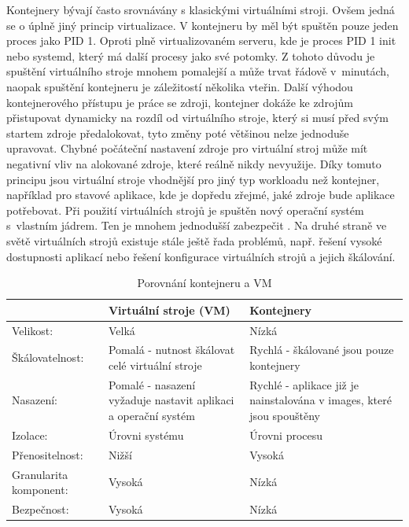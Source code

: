 Kontejnery bývají často srovnávány s klasickými virtuálními stroji. Ovšem jedná se o úplně jiný princip virtualizace. V kontejneru by měl být spuštěn pouze jeden proces jako PID 1. Oproti plně virtualizovaném serveru, kde je proces PID 1 init nebo systemd, který má další procesy jako své potomky. Z tohoto důvodu je spuštění virtuálního stroje mnohem pomalejší a může trvat řádově v minutách, naopak spuštění kontejneru je záležitostí několika vteřin. Další výhodou kontejnerového přístupu je práce se zdroji, kontejner dokáže ke zdrojům přistupovat dynamicky na rozdíl od virtuálního stroje, který si musí před svým startem zdroje předalokovat, tyto změny poté většinou nelze jednoduše upravovat. Chybné počáteční nastavení zdroje pro virtuální stroj může mít negativní vliv na alokované zdroje, které reálně nikdy nevyužije. Díky tomuto principu jsou virtuální stroje vhodnější pro jiný typ workloadu než kontejner, například pro stavové aplikace, kde je dopředu zřejmé, jaké zdroje bude aplikace potřebovat. Při použití virtuálních strojů je spuštěn nový operační systém s vlastním jádrem. Ten je mnohem jednodušší zabezpečit \cite{vm_container}. Na druhé straně ve světě virtuálních strojů existuje stále ještě řada problémů, např. řešení vysoké dostupnosti aplikací nebo řešení konfigurace virtuálních strojů a jejich škálování.

\begin{table}[H]
\begin{center}
\caption{Porovnání kontejneru a VM} 
\label{tbl:orch_comp}
\begin{tabular}{|p{25mm}|p{55mm}|p{55mm}|}
\hline
  ~   & Virtuální stroje (VM) & Kontejnery \\    \hline
Velikost: &  Velká &  Nízká  \\    \hline
Škálovatelnost: &  Pomalá - nutnost škálovat celé virtuální stroje &  Rychlá - škálované jsou pouze kontejnery \\    \hline
Nasazení: & Pomalé - nasazení vyžaduje nastavit aplikaci a operační systém & Rychlé - aplikace již je nainstalována v images, které jsou spouštěny \\    \hline
Izolace: &  Úrovni systému & Úrovni procesu  \\    \hline
Přenositelnost: & Nižší & Vysoká \\    \hline
Granularita komponent: & Vysoká & Nízká  \\    \hline
Bezpečnost: & Vysoká & Nízká  \\    \hline
\end{tabular}
\end{center}
\end{table}

